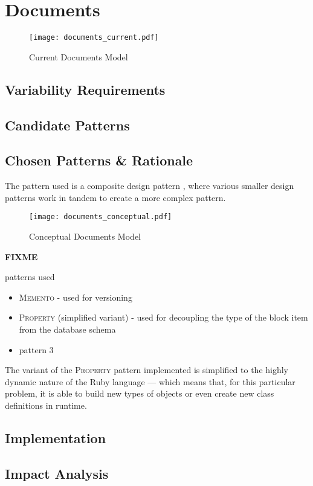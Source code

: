 \section{Documents}\label{sec:fa_documents}

\begin{figure}[H]
  \centering
  \texttt{[image: documents\_current.pdf]}
  \caption{Current Documents Model}
  \label{fig:documents_current}
\end{figure}

\subsection{Variability Requirements}\label{sec:fa_documents_variability_requirements}

\subsection{Candidate Patterns}\label{sec:fa_documents_candidate_patterns}

\subsection{Chosen Patterns \& Rationale}\label{sec:fa_documents_chosen_patterns_rationale}

The pattern used is a composite design pattern \cite{riehle_composite_patterns}, where various smaller design patterns work in tandem to create a more complex pattern.

\begin{figure}[H]
  \centering
  \texttt{[image: documents\_conceptual.pdf]}
  \caption{Conceptual Documents Model}
  \label{fig:documents_conceptual}
\end{figure}

\textbf{FIXME}

patterns used
\begin{itemize}
  \item \textsc{Memento} - used for versioning
  \item \textsc{Property} (simplified variant) - used for decoupling the type of the block item from the database schema
  \item pattern 3
\end{itemize}

The variant of the \textsc{Property} pattern implemented is simplified to the highly dynamic nature of the Ruby language --- which means that, for this particular problem, it is able to build new types of objects or even create new class definitions in runtime.

\subsection{Implementation}\label{sec:fa_documents_implementation}

\subsection{Impact Analysis}\label{sec:fa_documents_impact_analysis}
